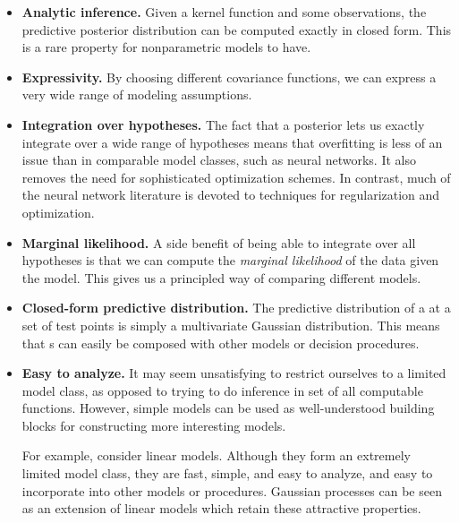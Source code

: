 \begin{itemize}

\item {\bf Analytic inference.}
Given a kernel function and some observations, the predictive posterior distribution can be computed exactly in closed form.
This is a rare property for nonparametric models to have.

\item {\bf Expressivity.}
By choosing different covariance functions, we can express a very wide range of modeling assumptions.

\item {\bf Integration over hypotheses.}
The fact that a \gp{} posterior lets us exactly integrate over a wide range of hypotheses means that overfitting is less of an issue than in comparable model classes, such as neural networks.
It also removes the need for sophisticated optimization schemes.
%
In contrast, much of the neural network literature is devoted to techniques for regularization and optimization.

\item {\bf Marginal likelihood.}
A side benefit of being able to integrate over all hypotheses is that we can compute the \emph{marginal likelihood} of the data given the model.
This gives us a principled way of comparing different models.

\item {\bf Closed-form predictive distribution.}
The predictive distribution of a \gp{} at a set of test points is simply a multivariate Gaussian distribution.
This means that \gp{}s can easily be composed with other models or decision procedures.

\item {\bf Easy to analyze.}
It may seem unsatisfying to restrict ourselves to a limited model class, as opposed to trying to do inference in set of all computable functions.
However, simple models can be used as well-understood building blocks for constructing more interesting models. %

For example, consider linear models.
Although they form an extremely limited model class, they are fast, simple, and easy to analyze, and easy to incorporate into other models or procedures.
Gaussian processes can be seen as an extension of linear models \citep{rasmussen38gaussian} which retain these attractive properties.


\end{itemize}




